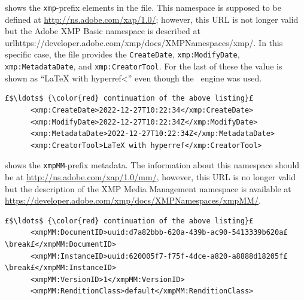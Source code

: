  shows the \texttt{xmp}-prefix elements in the file. This namespace is supposed to be defined at \url{http://ns.adobe.com/xap/1.0/}; however, this URL is not longer valid but the Adobe XMP Basic namespace is described at url{https://developer.adobe.com/xmp/docs/XMPNamespaces/xmp/}. In this specific case, the file provides the \texttt{CreateDate}, \texttt{xmp:ModifyDate}, \texttt{xmp:MetadataDate}, and \texttt{xmp:CreatorTool}. For the last of these the value is shown as ``LaTeX with hyperref<'' even though the \XeLaTeX~engine was used.
\begin{lstlisting}[style=myXML,
caption={The final set of metadata embedded in a PDF file}, label={lst:pdfinfoOutputPart12}]
£$\ldots$ {\color{red} continuation of the above listing}£ 
      <xmp:CreateDate>2022-12-27T10:22:34</xmp:CreateDate>
      <xmp:ModifyDate>2022-12-27T10:22:34Z</xmp:ModifyDate>
      <xmp:MetadataDate>2022-12-27T10:22:34Z</xmp:MetadataDate>
      <xmp:CreatorTool>LaTeX with hyperref</xmp:CreatorTool>
\end{lstlisting}

 shows the \texttt{xmpMM}-prefix metadata. The information about this namespace should be at \url{http://ns.adobe.com/xap/1.0/mm/}, however, this URL is no longer valid but the description of the XMP Media Management namespace is available at \url{https://developer.adobe.com/xmp/docs/XMPNamespaces/xmpMM/}.
\begin{lstlisting}[style=myXML,
caption={The \texttt{xmpMM}-prefix metadata embedded in a PDF file (two of the lines have been manually broken to fit the test in the margins)}, label={lst:pdfinfoOutputPart13}]
£$\ldots$ {\color{red} continuation of the above listing}£ 
      <xmpMM:DocumentID>uuid:d7a82bbb-620a-439b-ac90-5413339b620a£\break£</xmpMM:DocumentID>
      <xmpMM:InstanceID>uuid:620005f7-f75f-4dce-a820-a8888d18205f£\break£</xmpMM:InstanceID>
      <xmpMM:VersionID>1</xmpMM:VersionID>
      <xmpMM:RenditionClass>default</xmpMM:RenditionClass>
\end{lstlisting}

